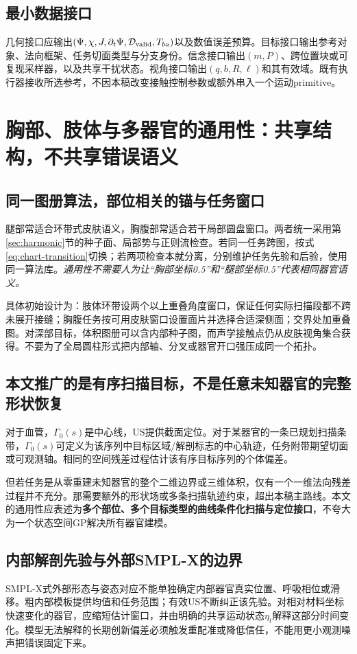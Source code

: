 \documentclass[UTF8,11pt,a4paper,fontset=fandol]{ctexart}
\numberwithin{equation}{section}
\theoremstyle{plain}
\theoremstyle{definition}
\theoremstyle{remark}
\begin{document}
\subsection{最小数据接口}
几何接口应输出$(\Psi,\chi,J,\partial_t\Psi,\mathcal D_{\rm valid},T_{ba})$以及数值误差预算。目标接口输出参考对象、法向框架、任务切面类型与分支身份。信念接口输出$(m,P)$、跨位置块或可复现采样器，以及共享干扰状态。视角接口输出$(q,b,R,\ell)$和其有效域。既有执行器接收所选参考，不因本稿改变接触控制参数或额外串入一个运动primitive。

\section{胸部、肢体与多器官的通用性：共享结构，不共享错误语义}\label{sec:generality}
\subsection{同一图册算法，部位相关的锚与任务窗口}
腿部常适合环带式皮肤语义，胸腹部常适合若干局部圆盘窗口。两者统一采用第\ref{sec:harmonic}节的种子面、局部势与正则流检查。若同一任务跨图，按式\eqref{eq:chart-transition}切换；若两项检查本就分离，分别维护任务先验和后验，使用同一算法库。\emph{通用性不需要人为让“胸部坐标0.5”和“腿部坐标0.5”代表相同器官语义。}

具体初始设计为：肢体环带设两个以上重叠角度窗口，保证任何实际扫描段都不跨未展开接缝；胸腹任务按可用皮肤窗口设置面片并选择合适深侧面；交界处加重叠图。对深部目标，体积图册可以含内部种子图，而声学接触点仍从皮肤视角集合获得。不要为了全局圆柱形式把内部轴、分叉或器官开口强压成同一个拓扑。

\subsection{本文推广的是有序扫描目标，不是任意未知器官的完整形状恢复}
对于血管，$\Gamma_0(s)$是中心线，US提供截面定位。对于某器官的一条已规划扫描条带，$\Gamma_0(s)$可定义为该序列中目标区域/解剖标志的中心轨迹，任务附带期望切面或可观测轴。相同的空间残差过程估计该有序目标序列的个体偏差。

但若任务是从零重建未知器官的整个二维边界或三维体积，仅有一个一维法向残差过程并不充分。那需要额外的形状场或多条扫描轨迹约束，超出本稿主路线。本文的通用性应表述为\textbf{多个部位、多个目标类型的曲线条件化扫描与定位接口}，不夸大为一个状态空间GP解决所有器官建模。

\subsection{内部解剖先验与外部SMPL-X的边界}
SMPL-X式外部形态与姿态对应不能单独确定内部器官真实位置、呼吸相位或滑移。粗内部模板提供均值和任务范围；有效US不断纠正该先验。对相对材料坐标快速变化的器官，应缩短估计窗口，并由明确的共享运动状态$\eta_t$解释这部分时间变化。模型无法解释的长期创新偏差必须触发重配准或降低信任，不能用更小观测噪声把错误固定下来。
\end{document}
